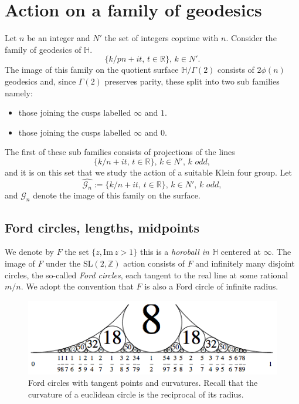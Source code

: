 \documentclass[12pt,a4paper]{amsart}
\def\HH{\mathbb{H}}
\def\im{\mathrm{Im}\,}
\def\xx{\HH/g2}
\def\ZZ{\mathbb{Z}}
\def\RR{\mathbb{R}}
\def\sl2{\mathrm{SL}(2, \ZZ)}
\def\g2{\Gamma(2)}
\def\xx{\HH/\g2}
\def\gg{\mathcal{G}_n}
\begin{document}
\section{Action on a family of geodesics}

Let $n$ be an integer and 
$N'$  the set of integers coprime with $n$.
Consider the family of geodesics of $\HH$.
$$\{  k/pn+ i t,\, t \in \RR \},\, k \in N'.$$
The image of this family on the quotient surface $\xx$ consists
of $2\phi(n)$ geodesics 
and, since $\Gamma(2)$ preserves parity, these split into two sub families namely:
\begin{itemize}
\item those joining the cusps labelled $\infty$ and $1$.
\item those joining the cusps labelled $\infty$ and $0$.
\end{itemize}
The first of these sub families consists of projections of the lines
$$ \{  k/n+ i t,\, t \in \RR \},\, k \in N',\, \textit{k odd},$$
and it is on this set that we study the action of a suitable Klein four group.
Let 
$$\hat{\gg} :=  \{  k/n+ i t,\, t \in \RR \},\, k \in N',\, \textit{k odd},$$
and  $\gg$  denote the image of this family on the surface.


\subsection{Ford circles, lengths, midpoints} 
\label{lengths}

We denote by $F$ the set  $\{ z, \im z > 1\}$
this is a \textit{horoball in $\HH$} centered at $\infty$.
The image of $F$ under the $\sl2$ action consists of
$F$ and infinitely many disjoint circles, the so-called \textit{Ford circles}, 
each tangent to the real line at some rational $m/n$.
We adopt the convention that $F$ is also a Ford circle of infinite radius.

  \begin{figure}[ht]
\begin{center}
\includegraphics[scale=.8]{Ford-circles.png} 
\end{center}
\caption{Ford circles with tangent points and curvatures.
Recall that the curvature of a euclidean circle is the reciprocal of its radius.}
\end{figure}
\end{document}
